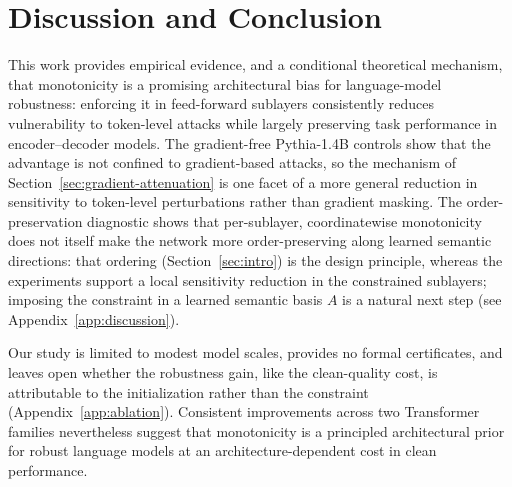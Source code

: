 \documentclass{article}
\theoremstyle{plain}
\theoremstyle{definition}
\theoremstyle{remark}
\theoremstyle{plain}
\begin{document}
\section{Discussion and Conclusion}
\label{sec:discussion}
This work provides empirical evidence, and a conditional theoretical mechanism, that monotonicity is a promising architectural bias for language-model robustness: enforcing it in feed-forward sublayers consistently reduces vulnerability to token-level attacks while largely preserving task performance in encoder--decoder models. The gradient-free Pythia-1.4B controls show that the advantage is not confined to gradient-based attacks, so the mechanism of Section~\ref{sec:gradient-attenuation} is one facet of a more general reduction in sensitivity to token-level perturbations rather than gradient masking. The order-preservation diagnostic shows that per-sublayer, coordinatewise monotonicity does not itself make the network more order-preserving along learned semantic directions: that ordering (Section~\ref{sec:intro}) is the design principle, whereas the experiments support a local sensitivity reduction in the constrained sublayers; imposing the constraint in a learned semantic basis $A$ is a natural next step (see Appendix~\ref{app:discussion}).

Our study is limited to modest model scales, provides no formal certificates, and leaves open whether the robustness gain, like the clean-quality cost, is attributable to the initialization rather than the constraint (Appendix~\ref{app:ablation}). Consistent improvements across two Transformer families nevertheless suggest that monotonicity is a principled architectural prior for robust language models at an architecture-dependent cost in clean performance.
\end{document}
